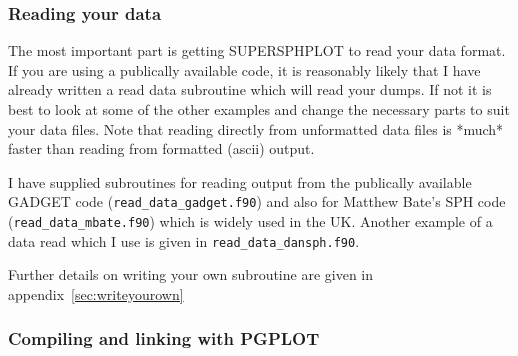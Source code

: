 \documentclass[a4paper,11pt]{article}
\begin{document}
\subsubsection{Reading your data}
 The most important part is getting SUPERSPHPLOT to read your data format.
If you are using a publically available code, it is reasonably likely that I
have already written a read data subroutine which will read your dumps.
If not it is best to look at some of the other examples and change the 
necessary parts to suit your data files. Note that reading directly from
unformatted data files is *much* faster than reading from formatted (ascii)
output.   

I have supplied subroutines for reading output from the publically available
GADGET code (\verb+read_data_gadget.f90+) and also for Matthew Bate's SPH code
(\verb+read_data_mbate.f90+) which is widely used in the UK. Another example of a
data read which I use is given in \verb+read_data_dansph.f90+.

Further details on writing your own subroutine are given in
appendix~\ref{sec:writeyourown}

\subsubsection{Compiling and linking with PGPLOT}
\end{document}
